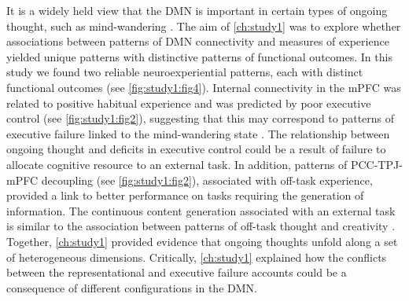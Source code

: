 It is a widely held view that the DMN is important in certain types of ongoing thought, such as mind-wandering \cite<see a review from>{SmallwoodSchooler2015}. The aim of \cref{ch:study1} was to explore whether associations between patterns of DMN connectivity and measures of experience yielded unique patterns with distinctive patterns of functional outcomes. In this study we found two reliable neuroexperiential patterns, each with distinct functional outcomes (see \cref{fig:study1:fig4}). Internal connectivity in the mPFC was related to positive habitual experience and was predicted by poor executive control (see \cref{fig:study1:fig2}), suggesting that this may correspond to patterns of executive failure linked to the mind-wandering state \cite{McVay2009}. The relationship between ongoing thought and deficits in executive control could be a result of failure to allocate cognitive resource to an external task. In addition, patterns of PCC-TPJ-mPFC decoupling (see \cref{fig:study1:fig2}), associated with off-task experience, provided a link to better performance on tasks requiring the generation of information.  The continuous content generation associated with an external task is similar to the association between patterns of off-task thought and creativity \cite{Baird2012}. Together, \cref{ch:study1} provided evidence that ongoing thoughts unfold along a set of heterogeneous dimensions. Critically, \cref{ch:study1} explained how the conflicts between the representational and executive failure accounts could be a consequence of different configurations in the DMN.


